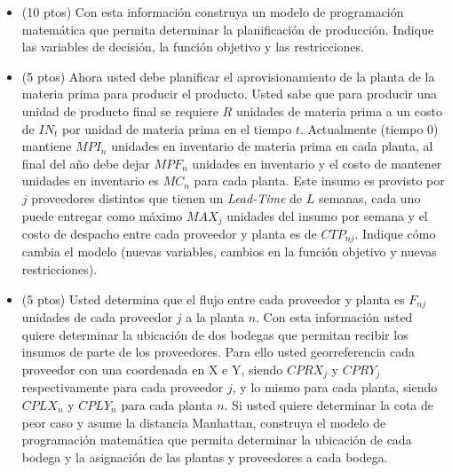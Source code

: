 \documentclass[11pt, a4paper]{article}
\begin{document}
  \begin{itemize}
    \item[\textbf{i.}] (10 ptos) Con esta información construya un modelo de programación matemática que permita determinar la planificación de producción. Indique las variables de decisión, la función objetivo y las restricciones.
    \item[\textbf{ii.}] (5 ptos) Ahora usted debe planificar el aprovisionamiento de la planta de la materia prima para producir el producto. Usted sabe que para producir una unidad de producto final se requiere $R$ unidades de materia prima a un costo de $IN_t$ por unidad de materia prima en el tiempo $t$. Actualmente (tiempo 0) mantiene $MPI_n$ unidades en inventario de materia prima en cada planta, al final del año debe dejar $MPF_n$ unidades en inventario y el costo de mantener unidades en inventario es $MC_n$ para cada planta. Este insumo es provisto por $j$ proveedores distintos que tienen un \textit{Lead-Time} de $L$ semanas, cada uno puede entregar como máximo $MAX_j$ unidades del insumo por semana y el costo de despacho entre cada proveedor y planta es de $CTP_{nj}$. Indique cómo cambia el modelo (nuevas variables, cambios en la función objetivo y nuevas restricciones).
    \item[\textbf{iii.}] (5 ptos) Usted determina que el flujo entre cada proveedor y planta es $F_{nj}$ unidades de cada proveedor $j$ a la planta $n$. Con esta información usted quiere determinar la ubicación de dos bodegas que permitan recibir los insumos de parte de los proveedores. Para ello usted georreferencia cada proveedor con una coordenada en X e Y, siendo $CPRX_j$ y $CPRY_j$ respectivamente para cada proveedor $j$, y lo mismo para cada planta, siendo $CPLX_n$ y $CPLY_n$ para cada planta $n$. Si usted quiere determinar la cota de peor caso y asume la distancia Manhattan, construya el modelo de programación matemática que permita determinar la ubicación de cada bodega y la asignación de las plantas y proveedores a cada bodega.
  \end{itemize}
\end{document}
